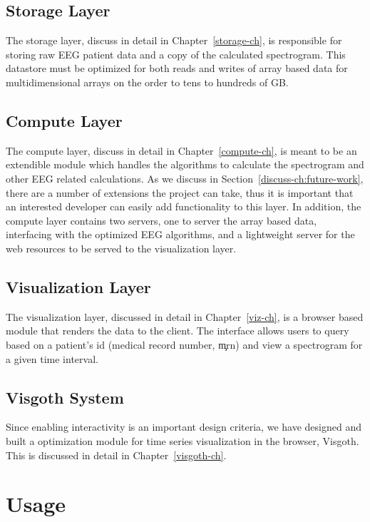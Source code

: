 \subsection{Storage Layer}

The storage layer, discuss in detail in Chapter~\ref{storage-ch}, is
responsible for storing raw EEG patient data and a copy of the calculated
spectrogram. This datastore must be optimized for both reads and writes of
array based data for multidimensional arrays on the order to tens to hundreds
of GB.

\subsection{Compute Layer}

The compute layer, discuss in detail in Chapter~\ref{compute-ch}, is meant to
be an extendible module which handles the algorithms to calculate the
spectrogram and other EEG related calculations. As we discuss in
Section~\ref{discuss-ch:future-work}, there are a number of extensions the
project can take, thus it is important that an interested developer can easily
add functionality to this layer. In addition, the compute layer contains two
servers, one to server the array based data, interfacing with the optimized EEG
algorithms, and a lightweight server for the web resources to be served to the
visualization layer.

\subsection{Visualization Layer}

The visualization layer, discussed in detail in Chapter~\ref{viz-ch}, is a browser
based module that renders the data to the client. The interface allows users to
query based on a patient's id (medical record number, \c{mrn}) and view a spectrogram
for a given time interval.

\subsection{Visgoth System}

Since enabling interactivity is an important design criteria, we have designed
and built a optimization module for time series visualization in the browser,
Visgoth. This is discussed in detail in Chapter~\ref{visgoth-ch}.

\section{Usage}

